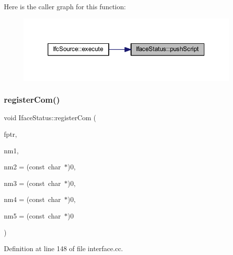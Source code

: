 Here is the caller graph for this function\+:
\nopagebreak
\begin{figure}[H]
\begin{center}
\leavevmode
\includegraphics[width=332pt]{class_iface_status_a4be96e0e55138d3b6a74496b6ae61a88_icgraph}
\end{center}
\end{figure}
\mbox{\label{class_iface_status_ad4fec227b244e8242fef9d36020a76fa}} 
\subsubsection{\texorpdfstring{registerCom()}{registerCom()}}
{\footnotesize\ttfamily void Iface\+Status\+::register\+Com (\begin{DoxyParamCaption}\item[{\mbox{\hyperlink{class_iface_command}{Iface\+Command}} $\ast$}]{fptr,  }\item[{const char $\ast$}]{nm1,  }\item[{const char $\ast$}]{nm2 = {\ttfamily (const~char~$\ast$)0},  }\item[{const char $\ast$}]{nm3 = {\ttfamily (const~char~$\ast$)0},  }\item[{const char $\ast$}]{nm4 = {\ttfamily (const~char~$\ast$)0},  }\item[{const char $\ast$}]{nm5 = {\ttfamily (const~char~$\ast$)0} }\end{DoxyParamCaption})}



Definition at line 148 of file interface.\+cc.

